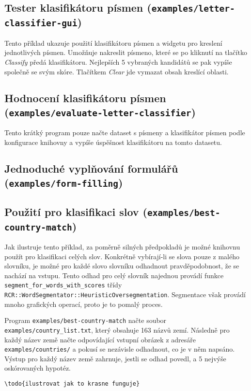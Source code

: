 \documentclass[a4paper]{article}
\begin{document}
\subsection{Tester klasifikátoru písmen (\texttt{examples/letter-classifier-gui})}
Tento příklad ukazuje použití klasifikátoru písmen a widgetu pro kreslení
jednotlivých písmen. Umožňuje nakreslit písmeno, které se po kliknutí na
tlačítko \textit{Classify} předá klasifikátoru. Nejlepších 5 vybraných kandidátů
se pak vypíše společně se svým skóre. Tlačítkem \textit{Clear} jde vymazat obsah
kreslící oblasti.

\subsection{Hodnocení klasifikátoru písmen (\texttt{examples/evaluate-letter-classifier})}
Tento krátký program pouze načte dataset s písmeny a klasifikátor písmen podle
konfigurace knihovny a vypíše úspěšnost klasifikátoru na tomto datasetu.

\subsection{Jednoduché vyplňování formulářů (\texttt{examples/form-filling})}

\subsection{Použití pro klasifikaci slov (\texttt{examples/best-country-match})}
Jak ilustruje tento příklad, za poměrně silných předpokladů je možné knihovnu
použít pro klasifikaci celých slov. Konkrétně vybírají-li se slova pouze z
malého slovníku, je možné pro každé slovo slovníku odhadnout pravděpodobnost,
že se nachází na vstupu. Tento odhad pro celý slovník najednou provádí funkce
\texttt{segment\_for\_words\_with\_scores} třídy
\texttt{RCR::WordSegmentator::HeuristicOversegmentation}.
Segmentace však provádí mnoho grafických operací, proto je to pomalý proces.

Program \texttt{examples/best-country-match} načte soubor
\texttt{examples/country\_list.txt}, který obsahuje 163 názvů zemí.
Následně pro každý název země načte odpovídající vstupní obrázek z adresáře
\texttt{examples/countries/} a pokusí se nezávisle odhadnout, co je v něm
napsáno. Výstup pro každý název země zahrnuje, jestli se odhad povedl, a
5 nejvýše oskórovaných hypotéz.

\begin{lstlisting}
\todo{ilustrovat jak to krasne funguje}
\end{lstlisting}
\end{document}
